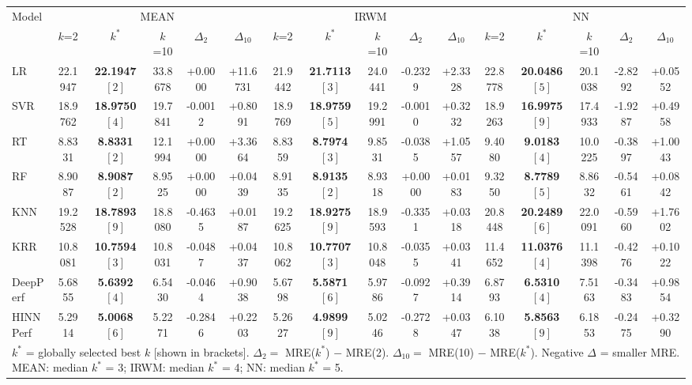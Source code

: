 \begin{tabular}{lccccccccccccccc}
\toprule
Model & \multicolumn{5}{c}{MEAN} & \multicolumn{5}{c}{IRWM} & \multicolumn{5}{c}{NN} \\
\cmidrule{2-6}\cmidrule{7-11}\cmidrule{12-16}
& $k$=2 & $k^*$ & $k$=10 & $\Delta_{2}$ & $\Delta_{10}$ & $k$=2 & $k^*$ & $k$=10 & $\Delta_{2}$ & $\Delta_{10}$ & $k$=2 & $k^*$ & $k$=10 & $\Delta_{2}$ & $\Delta_{10}$ \\
\midrule
LR & 22.1947 & \textbf{22.1947 $[2]$} & 33.8678 & +0.0000 & +11.6731 & 21.9442 & \textbf{21.7113 $[3]$} & 24.0441 & -0.2329 & +2.3328 & 22.8778 & \textbf{20.0486 $[5]$} & 20.1038 & -2.8292 & +0.0552 \\
SVR & 18.9762 & \textbf{18.9750 $[4]$} & 19.7841 & -0.0012 & +0.8091 & 18.9769 & \textbf{18.9759 $[5]$} & 19.2991 & -0.0010 & +0.3232 & 18.9263 & \textbf{16.9975 $[9]$} & 17.4933 & -1.9287 & +0.4958 \\
RT & 8.8331 & \textbf{8.8331 $[2]$} & 12.1994 & +0.0000 & +3.3664 & 8.8359 & \textbf{8.7974 $[3]$} & 9.8531 & -0.0385 & +1.0557 & 9.4080 & \textbf{9.0183 $[4]$} & 10.0225 & -0.3897 & +1.0043 \\
RF & 8.9087 & \textbf{8.9087 $[2]$} & 8.9525 & +0.0000 & +0.0439 & 8.9135 & \textbf{8.9135 $[2]$} & 8.9318 & +0.0000 & +0.0183 & 9.3250 & \textbf{8.7789 $[5]$} & 8.8632 & -0.5461 & +0.0842 \\
KNN & 19.2528 & \textbf{18.7893 $[9]$} & 18.8080 & -0.4635 & +0.0187 & 19.2625 & \textbf{18.9275 $[9]$} & 18.9593 & -0.3351 & +0.0318 & 20.8448 & \textbf{20.2489 $[6]$} & 22.0091 & -0.5960 & +1.7602 \\
KRR & 10.8081 & \textbf{10.7594 $[3]$} & 10.8031 & -0.0487 & +0.0437 & 10.8062 & \textbf{10.7707 $[3]$} & 10.8048 & -0.0355 & +0.0341 & 11.4652 & \textbf{11.0376 $[4]$} & 11.1398 & -0.4276 & +0.1022 \\
DeepPerf & 5.6855 & \textbf{5.6392 $[4]$} & 6.5430 & -0.0464 & +0.9038 & 5.6798 & \textbf{5.5871 $[6]$} & 5.9786 & -0.0927 & +0.3914 & 6.8793 & \textbf{6.5310 $[4]$} & 7.5163 & -0.3483 & +0.9854 \\
HINNPerf & 5.2914 & \textbf{5.0068 $[6]$} & 5.2271 & -0.2846 & +0.2203 & 5.2627 & \textbf{4.9899 $[9]$} & 5.0246 & -0.2728 & +0.0347 & 6.1038 & \textbf{5.8563 $[9]$} & 6.1853 & -0.2475 & +0.3290 \\
\bottomrule
\multicolumn{16}{l}{\footnotesize $k^*$ = globally selected best $k$ [shown in brackets]. $\Delta_2 = $ MRE($k^*$) $-$ MRE(2). $\Delta_{10} = $ MRE(10) $-$ MRE($k^*$). Negative $\Delta$ = smaller MRE. MEAN: median $k^*$ = 3; IRWM: median $k^*$ = 4; NN: median $k^*$ = 5.}
\end{tabular}
